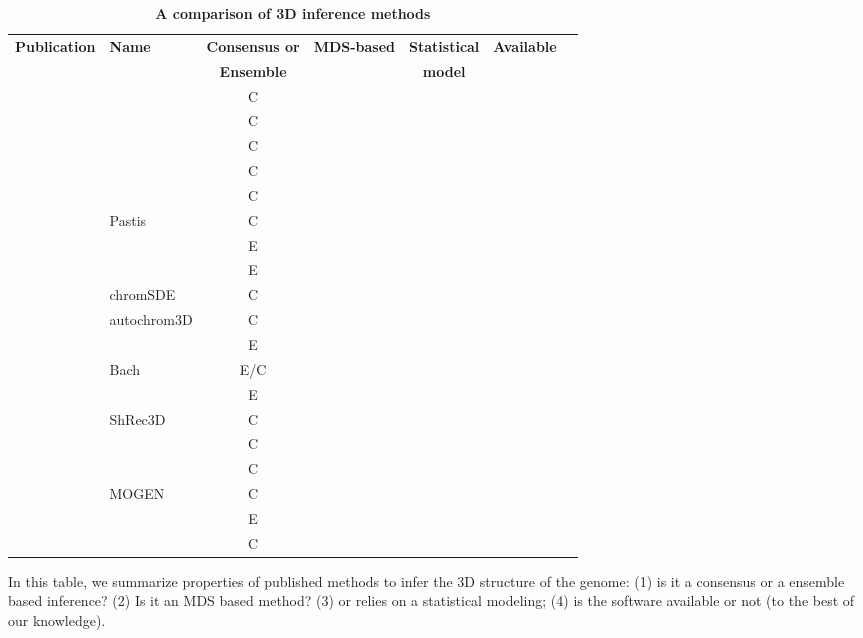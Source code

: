 \documentclass[letterpaper,12pt]{article}
\newcommand*\CHECK{\ding{51}}
\begin{document}
\begin{table}[ht!]
\begin{center}
\scriptsize
\begin{tabular}{rlccccc}
\hline
\multirow{2}{*}{\textbf{\footnotesize Publication}} & \multirow{2}{*}{\textbf{\footnotesize Name}} &
\textbf{\footnotesize Consensus or} 
&\multirow{2}{*}{\textbf{\footnotesize MDS-based}} & \textbf{\footnotesize Statistical} &
\multirow{2}{*}{\textbf{\footnotesize Available}} \\
& & \textbf{\footnotesize Ensemble}
 & & \textbf{\footnotesize model} & \\
\hline
\hline
\scriptsize{\cite{dekker:capturing}} & & C & \CHECK & & \\
\scriptsize{\cite{duan:three-dimensional}} &  & C & \CHECK & & \CHECK \\
\scriptsize{\cite{tanizawa:mapping}} & & C & \CHECK & & \\
\scriptsize{\cite{ay:three-dimensional}} & & C & \CHECK & & \\
\scriptsize{\cite{ben-elazar:spatial}} & & C & \CHECK & & \CHECK \\
\scriptsize{\cite{varoquaux:statistical}} & Pastis & C & & \CHECK & \CHECK\\
\scriptsize{\cite{bau:three-dimensional}} & & E & & &  \\
\scriptsize{\cite{umbarger:three-dimensional}} & & E  & & &\\
\scriptsize{\cite{zhang:inference}} & chromSDE & C &  \CHECK & & \CHECK\\
\scriptsize{\cite{peng:sequencing}} & autochrom3D & C &  \CHECK & & \CHECK\\
\scriptsize{\cite{rousseau:three}} & & E & & \CHECK & \CHECK\\
\scriptsize{\cite{hu:bayesian}} & Bach & E/C &  & \CHECK & \CHECK\\
\scriptsize{\cite{kalhor:genome}} & & E &   & &\\
\scriptsize{\cite{lesne:3d}} & ShRec3D & C  & \CHECK & & \CHECK \\
\scriptsize{\cite{trieu:large}} & & C & & & \\
\scriptsize{\cite{trieu:3D}} & & C & &  & \\
\scriptsize{\cite{trieu:MOGEN}} & MOGEN & C & & & \\
\scriptsize{\cite{nagano:single-cell}} & & E & & & \\
\scriptsize{\cite{paulsen:manifold}} & & C & \CHECK & & \CHECK \\
\hline
\end{tabular}
\end{center}
\caption{\bf A comparison of 3D inference methods}{In this table, we summarize
properties of published methods to infer the 3D structure of the genome: (1)
is it a consensus or a ensemble based inference? (2) Is it an MDS based
method? (3) or relies on a statistical modeling; (4) is the software
available or not (to the best of our knowledge).}
\end{table}
\end{document}
